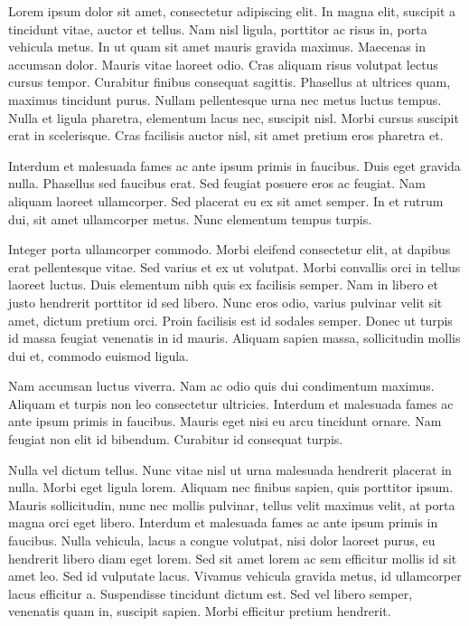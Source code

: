 Lorem ipsum dolor sit amet, consectetur adipiscing elit. In magna elit, suscipit a tincidunt vitae, auctor et tellus. Nam nisl ligula, porttitor ac risus in, porta vehicula metus. In ut quam sit amet mauris gravida maximus. Maecenas in accumsan dolor. Mauris vitae laoreet odio. Cras aliquam risus volutpat lectus cursus tempor. Curabitur finibus consequat sagittis. Phasellus at ultrices quam, maximus tincidunt purus. Nullam pellentesque urna nec metus luctus tempus. Nulla et ligula pharetra, elementum lacus nec, suscipit nisl. Morbi cursus suscipit erat in scelerisque. Cras facilisis auctor nisl, sit amet pretium eros pharetra et.

Interdum et malesuada fames ac ante ipsum primis in faucibus. Duis eget gravida nulla. Phasellus sed faucibus erat. Sed feugiat posuere eros ac feugiat. Nam aliquam laoreet ullamcorper. Sed placerat eu ex sit amet semper. In et rutrum dui, sit amet ullamcorper metus. Nunc elementum tempus turpis.

Integer porta ullamcorper commodo. Morbi eleifend consectetur elit, at dapibus erat pellentesque vitae. Sed varius et ex ut volutpat. Morbi convallis orci in tellus laoreet luctus. Duis elementum nibh quis ex facilisis semper. Nam in libero et justo hendrerit porttitor id sed libero. Nunc eros odio, varius pulvinar velit sit amet, dictum pretium orci. Proin facilisis est id sodales semper. Donec ut turpis id massa feugiat venenatis in id mauris. Aliquam sapien massa, sollicitudin mollis dui et, commodo euismod ligula.

Nam accumsan luctus viverra. Nam ac odio quis dui condimentum maximus. Aliquam et turpis non leo consectetur ultricies. Interdum et malesuada fames ac ante ipsum primis in faucibus. Mauris eget nisi eu arcu tincidunt ornare. Nam feugiat non elit id bibendum. Curabitur id consequat turpis.

Nulla vel dictum tellus. Nunc vitae nisl ut urna malesuada hendrerit placerat in nulla. Morbi eget ligula lorem. Aliquam nec finibus sapien, quis porttitor ipsum. Mauris sollicitudin, nunc nec mollis pulvinar, tellus velit maximus velit, at porta magna orci eget libero. Interdum et malesuada fames ac ante ipsum primis in faucibus. Nulla vehicula, lacus a congue volutpat, nisi dolor laoreet purus, eu hendrerit libero diam eget lorem. Sed sit amet lorem ac sem efficitur mollis id sit amet leo. Sed id vulputate lacus. Vivamus vehicula gravida metus, id ullamcorper lacus efficitur a. Suspendisse tincidunt dictum est. Sed vel libero semper, venenatis quam in, suscipit sapien. Morbi efficitur pretium hendrerit.

